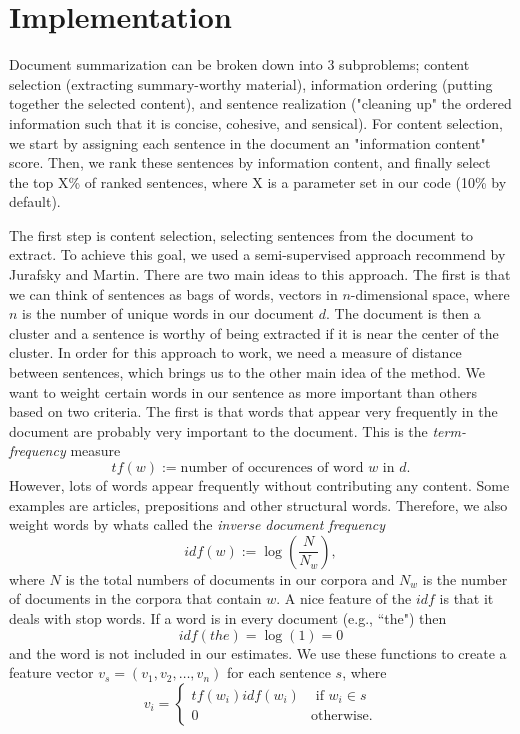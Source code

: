 \documentclass[12pt]{article}
\theoremstyle{plain}
\theoremstyle{definition}
\theoremstyle{remark}
\theoremstyle{plain}
\begin{document}
\section{Implementation}
Document summarization can be broken down into 3 subproblems; content selection (extracting summary-worthy material), information ordering (putting together the selected content), and sentence realization ("cleaning up" the ordered information such that it is concise, cohesive, and sensical). For content selection, we start by assigning each sentence in the document an "information content" score. Then, we rank these sentences by information content, and finally select the top X\% of ranked sentences, where X is a parameter set in our code (10\% by default).

The first step is content selection, selecting sentences from the document to extract. To achieve this goal, we used a semi-supervised approach recommend by Jurafsky and Martin. There are two main ideas to this approach. The first is that we can think of sentences as bags of words, vectors in $n$-dimensional space, where $n$ is the number of unique words in our document $d$. The document is then a cluster and a sentence is worthy of being extracted if it is near the center of the cluster. In order for this approach to work, we need a measure of distance between sentences, which brings us to the other main idea of the method. We want to weight certain words in our sentence as more important than others based on two criteria. The first is that words that appear very frequently in the document are probably very important to the document. This is the \emph{term-frequency} measure
$$tf(w) := \text{number of occurences of word $w$ in $d$}.$$ However, lots of words appear frequently without contributing any content. Some examples are articles, prepositions and other structural words. Therefore, we also weight words by whats called the \emph{inverse document frequency}
$$idf(w) := \log\left(\frac{N}{N_w}\right),$$
where $N$ is the total numbers of documents in our corpora and $N_w$ is the number of documents in the corpora that contain $w$. A nice feature of the $idf$ is that it deals with stop words. If a word is in every document (e.g., ``the") then 
$$idf(the) = \log(1) = 0$$
and the word is not included in our estimates.
We use these functions to create a feature vector $v_s = (v_1,v_2,\dots,v_n)$ for each sentence $s$, where
$$v_i =\begin{cases}
tf(w_i)idf(w_i) & \text{ if } w_i\in s\\
0 &\text{otherwise.}
\end{cases}$$
\end{document}
